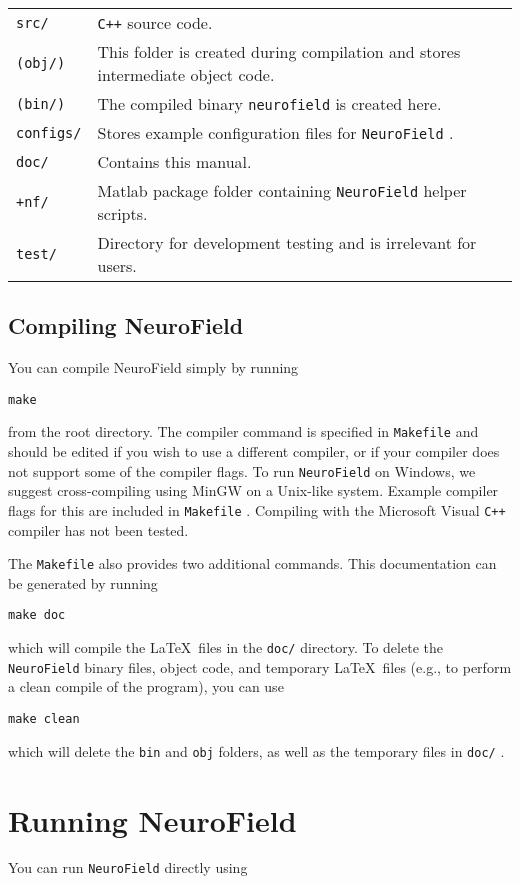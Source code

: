 \documentclass[12pt,a4paper]{article}
\newcommand{\type}[1]{{\small\small\tt #1} }
\newcommand{\NF}[0]{\type{NeuroField}}
\begin{document}
\begin{tabular}{l p{13cm}}
\type{src/}& \type{C++} source code.\\
\type{(obj/)}& This folder is created during compilation and stores intermediate object code.\\
\type{(bin/)}& The compiled binary \type{neurofield} is created here.\\
\type{configs/}& Stores example configuration files for \NF.\\
\type{doc/}& Contains this manual.\\
\type{+nf/}& Matlab package folder containing \NF helper scripts.\\
\type{test/}& Directory for development testing and is irrelevant for users.\\
\end{tabular}

\subsection{Compiling NeuroField} 
\label{sec:compiling}
You can compile NeuroField simply by running 

\begin{lstlisting}
make
\end{lstlisting}

from the root directory. The compiler command is specified in \type{Makefile} and should be edited if you wish to use a different compiler, or if your compiler does not support some of the compiler flags. To run \NF on Windows, we suggest cross-compiling using MinGW on a Unix-like system. Example compiler flags for this are included in \type{Makefile}. Compiling with the Microsoft Visual \type{C++} compiler has not been tested. 

The \type{Makefile} also provides two additional commands. This documentation can be generated by running 
\begin{lstlisting}
make doc
\end{lstlisting}
which will compile the \LaTeX\ files in the \type{doc/} directory. To delete the \NF binary files, object code, and temporary \LaTeX\ files (e.g., to perform a clean compile of the program), you can use
\begin{lstlisting}
make clean
\end{lstlisting}
which will delete the \type{bin} and \type{obj} folders, as well as the temporary files in \type{doc/}.

\section{Running NeuroField}
\label{sec:running}
You can run \NF directly using
\end{document}
